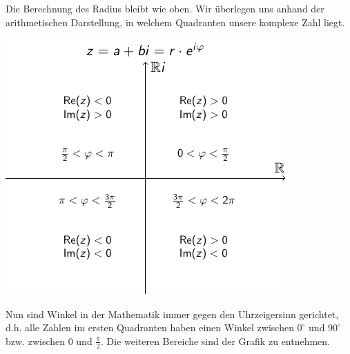 \documentclass[ngerman, a4paper, 11pt]{article}
\theoremstyle{nonumberplain}
\begin{document}
	Die Berechnung des Radius bleibt wie oben. 
	Wir überlegen uns anhand der arithmetischen Darstellung, in welchem Quadranten unsere komplexe Zahl liegt.
	\begin{center}
		\includegraphics{complex-numbers-angle}
	\end{center}
	Nun sind Winkel in der Mathematik immer gegen den Uhrzeigersinn gerichtet, d.h. alle Zahlen im ersten Quadranten haben einen Winkel zwischen $0^\circ$ und $90^\circ$ bzw. zwischen $0$ und $\frac{\pi}{2}$. Die weiteren Bereiche sind der Grafik zu entnehmen.
	
\end{document}
